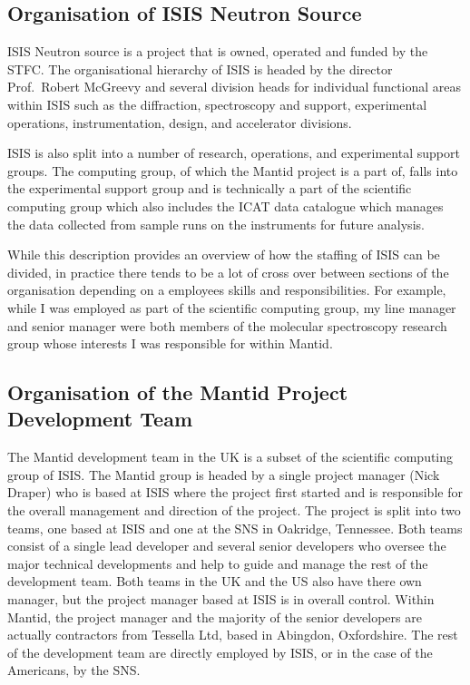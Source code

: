 \documentclass[paper=a4, fontsize=11pt]{scrartcl}	%
\numberwithin{equation}{section}															%
\numberwithin{figure}{section}																%
\numberwithin{table}{section}
\begin{document}
\subsection{Organisation of ISIS Neutron
Source}\label{organisation-of-isis-neutron-source}

ISIS Neutron source is a project that is owned, operated and funded by
the STFC. The organisational hierarchy of ISIS is headed by the director
Prof.~Robert McGreevy and several division heads for individual
functional areas within ISIS such as the diffraction, spectroscopy and
support, experimental operations, instrumentation, design, and
accelerator divisions.

ISIS is also split into a number of research, operations, and
experimental support groups. The computing group, of which the Mantid
project is a part of, falls into the experimental support group and is
technically a part of the scientific computing group which also includes
the ICAT data catalogue which manages the data collected from sample
runs on the instruments for future analysis.

While this description provides an overview of how the staffing of ISIS
can be divided, in practice there tends to be a lot of cross over
between sections of the organisation depending on a employees skills and
responsibilities. For example, while I was employed as part of the
scientific computing group, my line manager and senior manager were both
members of the molecular spectroscopy research group whose interests I
was responsible for within Mantid.

\subsection{Organisation of the Mantid Project Development
Team}\label{organisation-of-the-mantid-project-development-team}

The Mantid development team in the UK is a subset of the scientific
computing group of ISIS. The Mantid group is headed by a single project
manager (Nick Draper) who is based at ISIS where the project first
started and is responsible for the overall management and direction of
the project. The project is split into two teams, one based at ISIS and
one at the SNS in Oakridge, Tennessee. Both teams consist of a single
lead developer and several senior developers who oversee the major
technical developments and help to guide and manage the rest of the
development team. Both teams in the UK and the US also have there own
manager, but the project manager based at ISIS is in overall control.
Within Mantid, the project manager and the majority of the senior
developers are actually contractors from Tessella Ltd, based in
Abingdon, Oxfordshire. The rest of the development team are directly
employed by ISIS, or in the case of the Americans, by the SNS.
\end{document}
